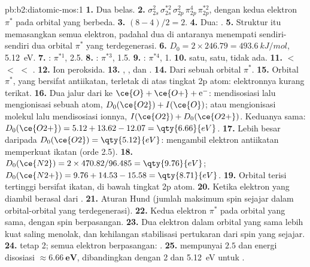 \begin{solution}{pb:b2:diatomic-mos:1}
\textbf{1.} Dua belas.
\textbf{2.} $\sigma_{2s}^2\,\sigma_{2s}^{*2}\,\sigma_{2p}^2\,\pi_{2p}^4\,\pi_{2p}^{*2}$,
dengan kedua elektron $\pi^*$ pada orbital yang berbeda.
\textbf{3.} $(8 - 4)/2 = 2$.
\textbf{4.} Dua:  .
\textbf{5.} Struktur itu memasangkan semua elektron, padahal dua di
antaranya menempati sendiri-sendiri dua orbital $\pi^*$ yang
terdegenerasi.
\textbf{6.} $D_0 = 2 \times 246.79 = \qty{493.6}{kJ/mol}$, \qty{5.12}{eV}.
\textbf{7.} : $\pi^{*1}$,  2.5.
\textbf{8.} : $\pi^{*3}$,  1.5.
\textbf{9.} : $\pi^{*4}$,  1.
\textbf{10.}  satu,  satu,  tidak ada.
\textbf{11.}  $<$  $<$  $<$ .
\textbf{12.} Ion peroksida.
\textbf{13.} , , dan .
\textbf{14.} Dari sebuah orbital $\pi^*$.
\textbf{15.} Orbital $\pi^*$, yang bersifat antiikatan, terletak di atas
tingkat 2p atom: elektronnya kurang terikat.
\textbf{16.} Dua jalur dari  ke $\ce{O} + \ce{O+} + \mathrm e^-$:
mendisosiasi lalu mengionisasi sebuah atom, $D_0(\ce{O2}) + I(\ce{O})$; atau
mengionisasi molekul lalu mendisosiasi ionnya, $I(\ce{O2}) + D_0(\ce{O2+})$.
Keduanya sama: $D_0(\ce{O2+}) = 5.12 + 13.62 - 12.07 = \qty{6.66}{eV}$.
\textbf{17.} Lebih besar daripada $D_0(\ce{O2}) = \qty{5.12}{eV}$: mengambil
elektron antiikatan memperkuat ikatan (orde 2.5).
\textbf{18.} $D_0(\ce{N2}) = 2 \times 470.82/96.485 = \qty{9.76}{eV}$; $D_0(\ce{N2+}) = 9.76 +
14.53 - 15.58 = \qty{8.71}{eV}$.
\textbf{19.} Orbital terisi tertinggi  bersifat ikatan, di bawah
tingkat 2p atom.
\textbf{20.} Ketika elektron yang diambil berasal dari .
\textbf{21.} Aturan Hund (jumlah maksimum spin sejajar dalam orbital-orbital
yang terdegenerasi).
\textbf{22.} Kedua elektron $\pi^*$ pada orbital yang sama, dengan spin
berpasangan.
\textbf{23.} Dua elektron dalam orbital yang sama lebih kuat saling menolak,
dan kehilangan stabilisasi pertukaran dari spin yang sejajar.
\textbf{24.}  tetap 2; semua elektron berpasangan: .
\textbf{25.}  mempunyai  $\boldsymbol{2.5}$ dan energi
disosiasi $\boldsymbol{\approx \qty{6.66}{eV}}$, dibandingkan dengan 2 dan
\qty{5.12}{eV} untuk .
\end{solution}
